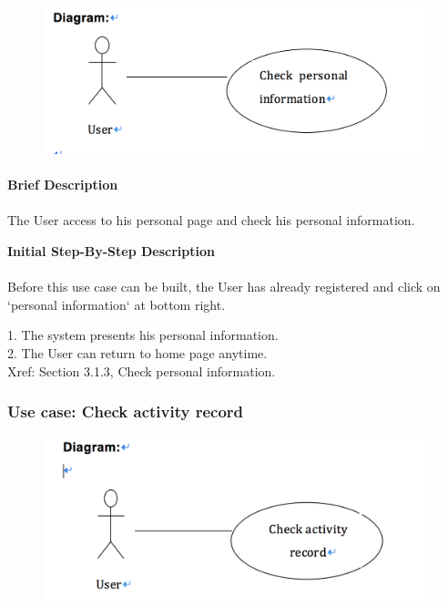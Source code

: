 \documentclass[12pt]{report}
\begin{document}
\begin{figure}[!htb]
  \includegraphics{3.PNG}
\end{figure}
\newpage
\paragraph{}
\begin{flushleft}
\textbf{Brief Description }
\paragraph{}
The User access to his personal page and check his personal information. \\

\begin{flushleft}
\textbf{Initial Step-By-Step Description }
\paragraph{}
Before this use case can be built, the User has already registered and click on `personal information` at bottom right.

\begin{flushleft}
1.	The system presents his personal information. \\
2.	The User can return to home page anytime. \\
Xref: Section 3.1.3, Check personal information.

\end{flushleft}
\end{flushleft}
\end{flushleft}

\newpage
\subsubsection{Use case:  Check activity record  }

\begin{figure}[!htb]
  \includegraphics{4.PNG}
\end{figure}
\end{document}
